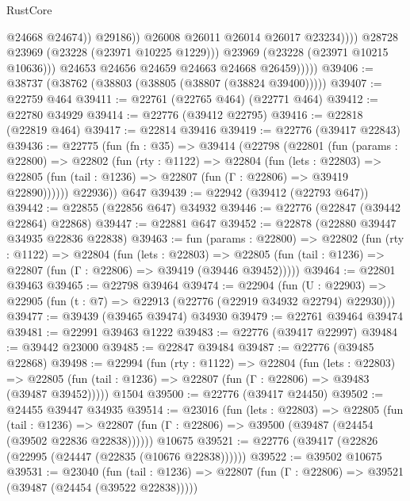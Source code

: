 \begin{lexlean}{RustCore}
\begin{coremodule}
                                  @24668
                                  @24674))
                              @29186))
                          @26008
                          @26011
                          @26014
                          @26017
                          @23234))))
                  @28728
                  @23969
                  (@23228 (@23971 @10225 @1229)))
                @23969
                (@23228 (@23971 @10215 @10636)))
              @24653
              @24656
              @24659
              @24663
              @24668
              @26459)))))
@39406 := @38737 (@38762 (@38803 (@38805 (@38807 (@38824 @39400)))))
@39407 := @22759 @464
@39411 := @22761 (@22765 @464) (@22771 @464)
@39412 := @22780 @34929
@39414 := @22776 (@39412 @22795)
@39416 := @22818 (@22819 @464)
@39417 := @22814 @39416
@39419 := @22776 (@39417 @22843)
@39436 := @22775
    (fun (fn : @35) =>
    @39414
      (@22798
        (@22801
          (fun (params : @22800) =>
          @22802
            (fun (rty : @1122) =>
            @22804
              (fun (lets : @22803) =>
              @22805 (fun (tail : @1236) => @22807 (fun (Γ : @22806) => @39419 @22890))))))
        @22936))
    @647
@39439 := @22942 (@39412 (@22793 @647))
@39442 := @22855 (@22856 @647) @34932
@39446 := @22776 (@22847 (@39442 @22864) @22868)
@39447 := @22881 @647
@39452 := @22878 (@22880 @39447 @34935 @22836 @22838)
@39463 := fun (params : @22800) =>
  @22802
    (fun (rty : @1122) =>
    @22804
      (fun (lets : @22803) =>
      @22805 (fun (tail : @1236) => @22807 (fun (Γ : @22806) => @39419 (@39446 @39452)))))
@39464 := @22801 @39463
@39465 := @22798 @39464
@39474 := @22904
    (fun (U : @22903) => @22905 (fun (t : @7) => @22913 (@22776 (@22919 @34932 @22794) @22930)))
@39477 := @39439 (@39465 @39474) @34930
@39479 := @22761 @39464 @39474
@39481 := @22991 @39463 @1222
@39483 := @22776 (@39417 @22997)
@39484 := @39442 @23000
@39485 := @22847 @39484
@39487 := @22776 (@39485 @22868)
@39498 := @22994
    (fun (rty : @1122) =>
    @22804
      (fun (lets : @22803) =>
      @22805 (fun (tail : @1236) => @22807 (fun (Γ : @22806) => @39483 (@39487 @39452)))))
    @1504
@39500 := @22776 (@39417 @24450)
@39502 := @24455 @39447 @34935
@39514 := @23016
    (fun (lets : @22803) =>
    @22805
      (fun (tail : @1236) =>
      @22807 (fun (Γ : @22806) => @39500 (@39487 (@24454 (@39502 @22836 @22838))))))
    @10675
@39521 := @22776 (@39417 (@22826 (@22995 (@24447 (@22835 (@10676 @22838))))))
@39522 := @39502 @10675
@39531 := @23040
    (fun (tail : @1236) => @22807 (fun (Γ : @22806) => @39521 (@39487 (@24454 (@39522 @22838)))))

\end{coremodule}
\end{lexlean}
